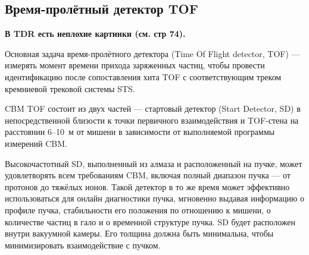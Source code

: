 \subsection{Время-пролётный детектор TOF}\label{sec:secTOF}

\textbf{В TDR есть неплохие картинки (см. стр 74).}


Основная задача время-пролётного детектора (Time Of Flight detector, TOF) --- измерять момент времени прихода заряженных частиц, чтобы провести идентификацию после сопоставления хита TOF с соответствующим треком кремниевой трековой системы STS.


CBM TOF состоит из двух частей --- стартовый детектор (Start Detector, SD) в непосредственной близости к точки первичного взаимодействия и TOF-стена на расстоянии 6--10~м от мишени в зависимости от выполняемой программы измерений CBM.

Высокочастотный SD, выполненный из алмаза и расположенный на пучке, может удовлетворять всем требованиям CBM, включая полный диапазон пучка --- от протонов до тяжёлых ионов. Такой детектор в то же время может эффективно использоваться для онлайн диагностики пучка, мгновенно выдавая информацию о профиле пучка, стабильности его положения по отношению к мишени, о количестве частиц в гало и о временной структуре пучка. SD будет расположен внутри вакуумной камеры. Его толщина должна быть минимальна, чтобы минимизировать взаимодействие с пучком.


